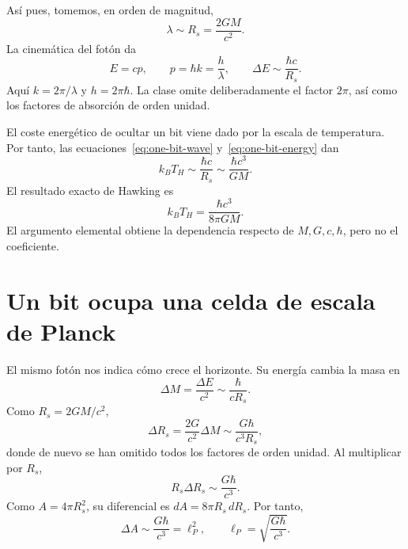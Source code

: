 Así pues, tomemos, en orden de magnitud,
\begin{equation}
\lambda\sim R_s=\frac{2GM}{c^2}.
\label{eq:one-bit-wave}
\end{equation}
La cinemática del fotón da
\begin{equation}
E=cp,
\qquad
p=\hbar k=\frac{h}{\lambda},
\qquad
\Delta E\sim\frac{\hbar c}{R_s}.
\label{eq:one-bit-energy}
\end{equation}
Aquí \(k=2\pi/\lambda\) y \(h=2\pi\hbar\). La clase omite deliberadamente el factor \(2\pi\), así como los factores de absorción de orden unidad.

\begin{classroomqa}
\end{classroomqa}

El coste energético de ocultar un bit viene dado por la escala de temperatura. Por tanto, las ecuaciones~\eqref{eq:one-bit-wave} y~\eqref{eq:one-bit-energy} dan
\begin{equation}
k_BT_H\sim\frac{\hbar c}{R_s}
\sim\frac{\hbar c^3}{GM}.
\end{equation}
El resultado exacto de Hawking es
\begin{equation}
k_BT_H=\frac{\hbar c^3}{8\pi GM}.
\end{equation}
El argumento elemental obtiene la dependencia respecto de \(M,G,c,\hbar\), pero no el coeficiente.

\section{Un bit ocupa una celda de escala de Planck}

El mismo fotón nos indica cómo crece el horizonte. Su energía cambia la masa en
\begin{equation}
\Delta M=\frac{\Delta E}{c^2}
\sim\frac{\hbar}{cR_s}.
\end{equation}
Como \(R_s=2GM/c^2\),
\begin{equation}
\Delta R_s=\frac{2G}{c^2}\Delta M
\sim\frac{G\hbar}{c^3R_s},
\end{equation}
donde de nuevo se han omitido todos los factores de orden unidad. Al multiplicar por \(R_s\),
\begin{equation}
R_s\Delta R_s\sim\frac{G\hbar}{c^3}.
\end{equation}
Como \(A=4\pi R_s^2\), su diferencial es \(dA=8\pi R_s\,dR_s\). Por tanto,
\begin{equation}
\Delta A\sim\frac{G\hbar}{c^3}=\ell_P^2,
\qquad
\ell_P=\sqrt{\frac{G\hbar}{c^3}}.
\label{eq:planck-patch}
\end{equation}

